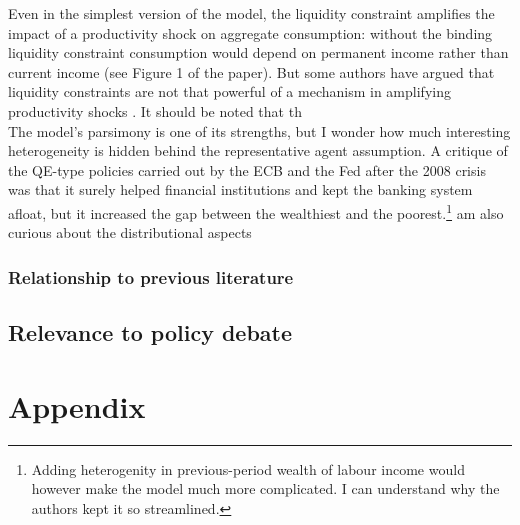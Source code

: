 \documentclass{amsart}
\theoremstyle{definition}
\theoremstyle{remark}
\numberwithin{equation}{section}
\begin{document}
Even in the simplest version of the model, the liquidity constraint amplifies the impact of a productivity shock on aggregate consumption: without the binding liquidity constraint consumption would depend on permanent income rather than current income (see Figure 1 of the paper). But some authors have argued that liquidity constraints are not that powerful of a mechanism in amplifying productivity shocks \citep{cordoba2004credit}. It should be noted that th \\

The model's parsimony is one of its strengths, but I wonder how much interesting heterogeneity is hidden behind the representative agent assumption. A critique of the QE-type policies carried out by the ECB and the Fed after the 2008 crisis was that it surely helped financial institutions and kept the banking system afloat, but it increased the gap between the wealthiest and the poorest.\footnote{Adding heterogenity in previous-period wealth of labour income would however make the model much more complicated. I can understand why the authors kept it so streamlined.}
am also curious about the distributional aspects 

\subsubsection{Relationship to previous literature}

\subsection*{Relevance to policy debate}

\newpage




\newpage

\section*{Appendix}
\end{document}
